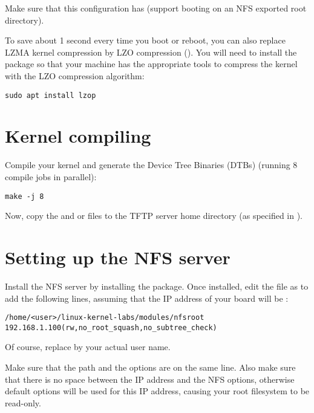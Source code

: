 Make sure that this configuration has  (support
booting on an NFS exported root directory).

To save about 1 second every time you boot or reboot, you can also
replace LZMA kernel compression by LZO compression
(). You will need to install the 
package so that your machine has the appropriate tools to compress the
kernel with the LZO compression algorithm:

\begin{verbatim}
sudo apt install lzop
\end{verbatim}

\section{Kernel compiling}

Compile your kernel and generate the Device Tree Binaries (DTBs)
(running 8 compile jobs in parallel):

\begin{verbatim}
make -j 8
\end{verbatim}

Now, copy the  and 
or  files
to the TFTP server home directory (as specified in ).

\section{Setting up the NFS server}

Install the NFS server by installing the 
package. Once installed, edit the  file as
 to add the following lines, assuming that the IP address
of your board will be :

\scriptsize
\begin{verbatim}
/home/<user>/linux-kernel-labs/modules/nfsroot 192.168.1.100(rw,no_root_squash,no_subtree_check)
\end{verbatim}
\normalsize

Of course, replace  by your actual user name.

Make sure that the path and the options are on the same line.
Also make sure that there is no space between the IP address and the NFS
options, otherwise default options will be used for this IP address,
causing your root filesystem to be read-only.

